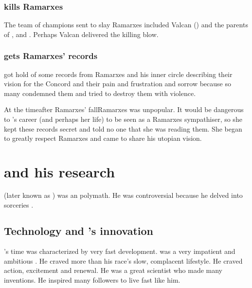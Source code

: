 \subsubsection{\Sethicus kills Ramarxes}
The team of champions sent to slay Ramarxes included Valcan () and the parents of \Nexagglachel, \Iscrafel and \Secherdamon. 
Perhaps Valcan delivered the killing blow. 





\subsubsection[Tyrasshana gets Ramarxes' records]{\Tiamat gets Ramarxes' records}
\Tiamat got hold of some records from Ramarxes and his inner circle describing their vision for the Concord and their pain and frustration and sorrow because so many condemned them and tried to destroy them with violence.

At the time\dash after Ramarxes' fall\dash Ramarxes was unpopular.
It would be dangerous to \Tiamat's career (and perhaps her life) to be seen as a Ramarxes sympathiser, so she kept these records secret and told no one that she was reading them. 
She began to greatly respect Ramarxes and came to share his utopian vision. 

























\section{\Sethicus and his research}
 (later known as \Sethicus) was an \ophidian polymath.
He was controversial because he delved into sorceries . 







\subsection{Technology and \Sethicus's innovation}
\Sethicus's time was characterized by very fast development. 
\Sethicus was a very impatient and ambitious \ophidian.
He craved more than his race's slow, complacent lifestyle.
He craved action, excitement and renewal.
He was a great scientist who made many inventions.
He inspired many followers to live fast like him. 

